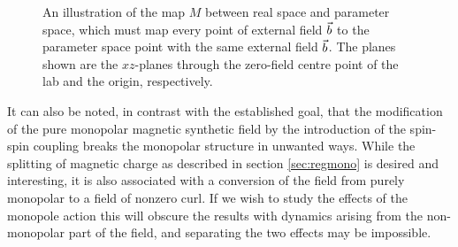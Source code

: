 \documentclass[main.tex]{subfiles}
\begin{document}
\begin{figure}[h]
        \centering
        \caption{\centering An illustration of the map \(M\) between real space and parameter space,
        which must map every point of external field \(\vec{b}\) to the parameter space
point with the same external field \(\vec{b}\). The planes shown are the \(xz\)-planes
through the zero-field centre point of the lab and the origin, respectively.}
        \label{fig:fieldcompare}
\end{figure}

It can also be noted, in contrast with the established goal, that the modification of the
pure monopolar magnetic synthetic field by the introduction of the spin-spin coupling
breaks the monopolar structure in unwanted ways. While the splitting of magnetic charge as
described in section \ref{sec:regmono} is desired and interesting, it is also associated
with a conversion of the field from purely monopolar to a field of nonzero curl. If we wish
to study the effects of the monopole action this will obscure the results with dynamics
arising from the non-monopolar part of the field, and separating the two effects may be
impossible.
\end{document}
